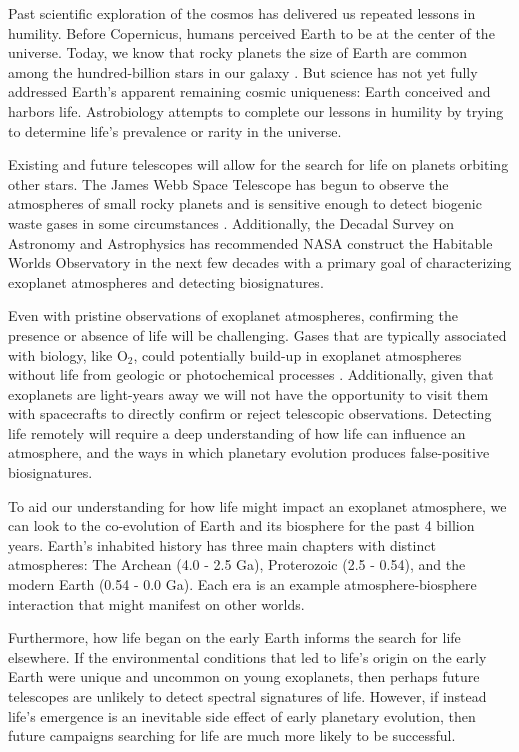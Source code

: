 
Past scientific exploration of the cosmos has delivered us repeated lessons in humility. Before Copernicus, humans perceived Earth to be at the center of the universe. Today, we know that rocky planets the size of Earth are common among the hundred-billion stars in our galaxy \citep{Burke_2015}. But science has not yet fully addressed Earth's apparent remaining cosmic uniqueness: Earth conceived and harbors life. Astrobiology attempts to complete our lessons in humility by trying to determine life's prevalence or rarity in the universe. 

Existing and future telescopes will allow for the search for life on planets orbiting other stars. The James Webb Space Telescope has begun to observe the atmospheres of small rocky planets and is sensitive enough to detect biogenic waste gases in some circumstances \citep{KrissansenTotton_2018_detect}. Additionally, the Decadal Survey on Astronomy and Astrophysics has recommended NASA construct the Habitable Worlds Observatory in the next few decades with a primary goal of characterizing exoplanet atmospheres and detecting biosignatures.

Even with pristine observations of exoplanet atmospheres, confirming the presence or absence of life will be challenging. Gases that are typically associated with biology, like O$_2$, could potentially build-up in exoplanet atmospheres without life from geologic or photochemical processes \citep{KrissansenTotton_2021_oxygen,Meadows_2018}. Additionally, given that exoplanets are light-years away we will not have the opportunity to visit them with spacecrafts to directly confirm or reject telescopic observations. Detecting life remotely will require a deep understanding of how life can influence an atmosphere, and the ways in which planetary evolution produces false-positive biosignatures.

To aid our understanding for how life might impact an exoplanet atmosphere, we can look to the co-evolution of Earth and its biosphere for the past 4 billion years. Earth's inhabited history has three main chapters with distinct atmospheres: The Archean (4.0 - 2.5 Ga), Proterozoic (2.5 - 0.54), and the modern Earth (0.54 - 0.0 Ga). Each era is an example atmosphere-biosphere interaction that might manifest on other worlds.

Furthermore, how life began on the early Earth informs the search for life elsewhere. If the environmental conditions that led to life's origin on the early Earth were unique and uncommon on young exoplanets, then perhaps future telescopes are unlikely to detect spectral signatures of life. However, if instead life's emergence is an inevitable side effect of early planetary evolution, then future campaigns searching for life are much more likely to be successful.

